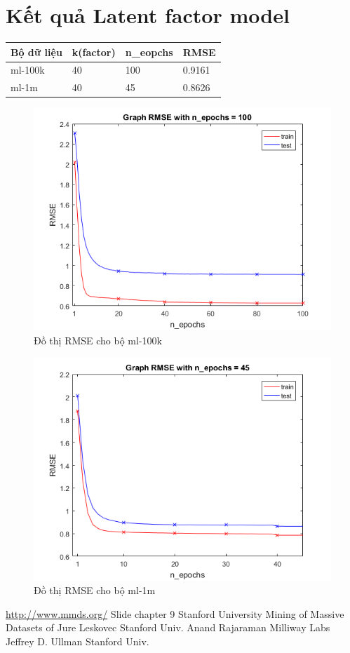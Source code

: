 \documentclass[a4paper,11pt]{report}
\begin{document}
\section{Kết quả Latent factor model}
\begin{center}
\begin{longtable}{|l|l|l|l|}
\hline
Bộ dữ liệu & k(factor) & n\_eopchs & RMSE \\
\hline
ml-100k & 40 & 100 & 0.9161 \\
ml-1m & 40 & 45 & 0.8626 \\
\hline
\end{longtable}
\end{center}
\begin{center}
\begin{figure}[h]
\includegraphics[scale=1]{RMSE.png}
\caption{Đồ thị RMSE cho bộ ml-100k}
\end{figure}
\end{center}
\begin{center}
\begin{figure}[h]
\includegraphics[scale=1]{RMSE!.png}
\caption{Đồ thị RMSE cho bộ ml-1m}
\end{figure}
\end{center}
\begin{thebibliography}{5}

\url{http://www.mmds.org/}
Slide chapter 9 Stanford University
Mining of Massive Datasets of Jure Leskovec Stanford Univ. Anand Rajaraman Milliway Labs Jeffrey D. Ullman Stanford Univ.
\end{thebibliography}
\end{document}
